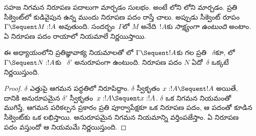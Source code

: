 \documentclass[../../../include/open-logic-section]{subfiles}
\begin{document}


సహజ నిగమన  నిరూపణ పదాలుగా మార్చడం సులభం. అంటే లోని  లోని  మార్చడం.  ప్రతి సీక్వెంట్‌లో కుడివైపున ఉన్న  ముందు నిరూపణ పదం రాస్తే చాలు. అప్పుడు సీక్వెంట్ రూపం $\Gamma \Sequent M :
!A$ అవుతుంది. సందర్భం~$\Gamma$లో $M$ అనేది~$!A$కు \emph{సాక్ష్యంగా ఉంటుంది} అంటాం. ఏ నిరూపణ పదం రాయాలో  నియమాలే నిర్ణయిస్తాయి.

\begin{prop}
ఈ అధ్యాయంలోని ప్రతిజ్ఞావాక్య నియమాలతో లో $\Gamma \Sequent !A$కు గల ప్రతి ~$\delta$కూ, లో $\Gamma \Sequent N : !A$కు ~$\delta'$ అనురూపంగా ఉంటుంది. నిరూపణ పదం $N$ ఏదో~$\delta$ ఒక్కటే నిర్ణయిస్తుంది.
\end{prop}

\begin{proof}
$\delta$ ఎత్తుపై ఆగమన పద్ధతిలో నిరూపిద్దాం. $\delta$ స్వీకృతం $x:!A \Sequent !A$ అయితే, దానికి అనురూపమైన $\delta'$ స్వీకృతం~$x:!A \Sequent
x:!A$. $\delta$ ఒక నిగమన నియమంతో ముగిస్తే, ఆగమన పరికల్పన ప్రకారం ప్రతి పూర్వాపేక్షకూ ఒక నిరూపణ పదం, ఆ పదంతో కూడిన సీక్వెంట్‌కు ఒక   లభిస్తాయి. అనురూపమైన  నిగమన నియమాన్ని వర్తింపజేస్తాం. ఏ నిరూపణ పదం వస్తుందో ఆ నియమమే నిర్ణయిస్తుంది.
\end{proof}
\end{document}
